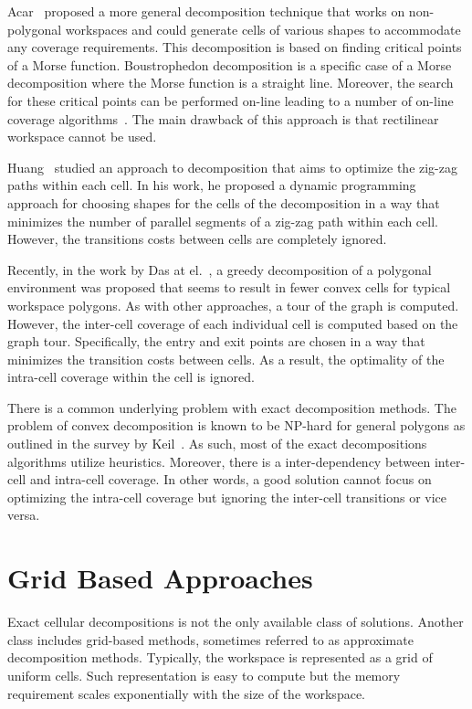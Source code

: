 \documentclass[../main.tex]{subfiles}
\begin{document}
Acar~\cite{Acar2002morse} proposed a more general decomposition technique that works on non-polygonal workspaces and could generate cells of various shapes to accommodate any coverage requirements. This decomposition is based on finding critical points of a Morse function. Boustrophedon decomposition is a specific case of a Morse decomposition where the Morse function is a straight line. Moreover, the search for these critical points can be performed on-line leading to a number of on-line coverage algorithms~\cite{acar2002sensor}. The main drawback of this approach is that rectilinear workspace cannot be used. 

Huang~\cite{Huang2001optimal} studied an approach to decomposition that aims to optimize the zig-zag paths within each cell. In his work, he proposed a dynamic programming approach for choosing shapes for the cells of the decomposition in a way that minimizes the number of parallel segments of a zig-zag path within each cell. However, the transitions costs between cells are completely ignored.

Recently, in the work by Das at el.~\cite{das2014mapping}, a greedy decomposition of a polygonal environment was proposed that seems to result in fewer convex cells for typical workspace polygons. As with other approaches, a tour of the graph is computed. However, the inter-cell coverage of each individual cell is computed based on the graph tour. Specifically, the entry and exit points are chosen in a way that minimizes the transition costs between cells. As a result, the optimality of the intra-cell coverage within the cell is ignored.

There is a common underlying problem with exact decomposition methods. The problem of convex decomposition is known to be NP-hard for general polygons as outlined in the survey by Keil~\cite{keil2000polygon}. As such, most of the exact decompositions algorithms utilize heuristics. Moreover, there is a inter-dependency between inter-cell and intra-cell coverage. In other words, a good solution cannot focus on optimizing the intra-cell coverage but ignoring the inter-cell transitions or vice versa.

\section{Grid Based Approaches}
\label{section:grid_based_approaches}

Exact cellular decompositions is not the only available class of solutions. Another class includes grid-based methods, sometimes referred to as approximate decomposition methods. Typically, the workspace is represented as a grid of uniform cells. Such representation is easy to compute but the memory requirement scales exponentially with the size of the workspace.
\end{document}
